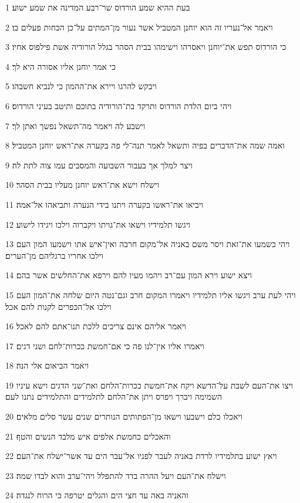 \par 1 בעת ההיא שמע הורדוס שר־רבע המדינה את שמע ישוע׃
\par 2 ויאמר אל־נעריו זה הוא יוחנן המטביל אשר נעור מן־המתים על־כן הכחות פעלים בו׃
\par 3 כי הורדוס תפש את־יוחנן ויאסרהו וישימהו בבית הסהר בגלל הורודיה אשת פילפוס אחיו׃
\par 4 כי אמר יוחנן אליו אסורה היא לך׃
\par 5 ויבקש להרגו ויירא את־ההמון כי לנביא חשבהו׃
\par 6 ויהי ביום הלדת הורדוס ותרקד בת־הורודיה בתוכם ותיטב בעיני הורדוס׃
\par 7 וישבע לה ויאמר מה־תשאל נפשך ואתן לך׃
\par 8 ואמה שמה את־הדברים בפיה ותשאל לאמר תנה־לי פה בקערה את־ראש יוחנן המטביל׃
\par 9 ויצר למלך אך בעבור השבועה והמסבים עמו צוה לתת לה׃
\par 10 וישלח וישא את־ראש יוחנן מעליו בבית הסהר׃
\par 11 ויביאו את־ראשו בקערה ויתנו בידי הנערה ותביאהו אל־אמה׃
\par 12 ויגשו תלמידיו וישאו את־גויתו ויקברוה וילכו ויגידו לישוע׃
\par 13 ויהי כשמעו את־זאת ויסר משם באניה אל־מקום חרבה ואין־איש אתו וישמעו המון העם וילכו אחריו ברגליהם מן־הערים׃
\par 14 ויצא ישוע וירא המון עם־רב ויהמו מעיו להם וירפא את־החלשים אשר בהם׃
\par 15 ויהי לעת ערב ויגשו אליו תלמידיו ויאמרו המקום חרב וגם־נטה היום שלחה את־המון העם וילכו אל־הכפרים לקנות להם אכל׃
\par 16 ויאמר אליהם אינם צריכים ללכת תנו־אתם להם לאכל׃
\par 17 ויאמרו אליו אין־לנו פה כי אם־חמשת ככרות־לחם ושני דגים׃
\par 18 ויאמר הביאום אלי הנה׃
\par 19 ויצו את־העם לשבת על־הדשא ויקח את־חמשת ככרות־הלחם ואת־שני הדגים וישא עיניו השמימה ויברך ויפרס ויתן את־הלחם לתלמידים והתלמידים נתנו לעם׃
\par 20 ויאכלו כלם וישבעו וישאו מן־הפתותים הנותרים שנים עשר סלים מלאים׃
\par 21 והאכלים כחמשת אלפים איש מלבד הנשים והטף׃
\par 22 ויאץ ישוע בתלמידיו לרדת באניה לעבר לפניו אל־עבר הים עד אשר־ישלח את־העם׃
\par 23 וישלח את־העם ויעל ההרה בדד להתפלל ויהי־ערב והוא לבדו שמה׃
\par 24 והאניה באה עד חצי הים והגלים יטרפה כי הרוח לנגדה׃
